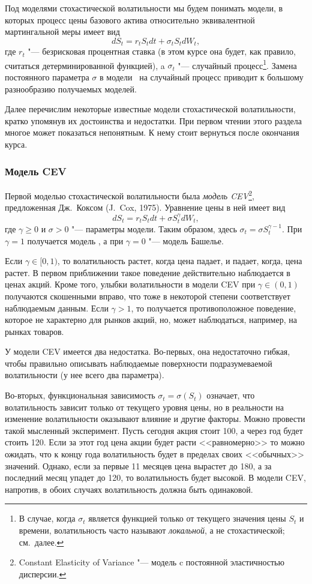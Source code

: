 Под моделями стохастической волатильности мы будем понимать модели, в которых процесс цены базового актива относительно эквивалентной мартингальной меры имеет вид
\[
dS_t = r_tS_t dt + \sigma_t S_t dW_t,
\]
где $r_t$ "--- безрисковая процентная ставка (в этом курсе она будет, как правило, считаться детерминированной функцией), a $\sigma_t$ "--- случайный процесс\footnote{В случае, когда $\sigma_t$ является функцией только от текущего значения цены $S_t$ и времени, волатильность часто называют \emph{локальной}, а не стохастической; см.~далее.}.
Замена постоянного параметра $\sigma$ в модели \bs\ на случайный процесс приводит к большому разнообразию получаемых моделей. 

Далее перечислим некоторые известные модели стохастической волатильности, кратко упомянув их достоинства и недостатки.
При первом чтении этого раздела многое может показаться непонятным.
К нему стоит вернуться после окончания курса.

\subsubsection{Модель CEV}

Первой моделью стохастической волатильности была \emph{модель CEV}\footnote{Constant Elasticity of Variance "--- модель c постоянной эластичностью дисперсии.}, предложенная Дж.~Коксом (J.~Cox, 1975).
Уравнение цены в ней имеет вид
\[
d S_t = r_tS_t dt + \sigma S_t^\gamma d W_t,
\]
где $\gamma \ge 0$ и $\sigma>0$ "--- параметры модели. Таким образом, здесь $\sigma_t = \sigma S_t^{\gamma-1}$. 
При $\gamma=1$ получается модель \bs, а при $\gamma=0$ "--- модель Башелье.

Если $\gamma\in[0,1)$, то волатильность растет, когда цена падает, и падает, когда, цена растет.
В первом приближении такое поведение действительно наблюдается в ценах акций.
Кроме того, улыбки волатильности в модели CEV при $\gamma\in(0,1)$ получаются скошенными вправо, что тоже в некоторой степени соответствует наблюдаемым данным.
Если $\gamma>1$, то получается противоположное поведение, которое не характерно для рынков акций, но, может наблюдаться, например, на рынках товаров.

У модели CEV имеется два недостатка.
Во-первых, она недостаточно гибкая, чтобы правильно описывать наблюдаемые поверхности подразумеваемой волатильности (у нее всего два параметра).

Во-вторых, функциональная зависимость $\sigma_t=\sigma(S_t)$ означает, что волатильность зависит только от текущего уровня цены, но в реальности на изменение волатильности оказывают влияние и другие факторы.
Можно провести такой мысленный эксперимент.
Пусть сегодня акция стоит 100, а через год будет стоить 120.
Если за этот год цена акции будет расти <<равномерно>> то можно ожидать, что к концу года волатильность будет в пределах своих <<обычных>> значений.
Однако, если за первые 11 месяцев цена вырастет до 180, а за последний месяц упадет до 120, то волатильность будет высокой. 
В модели CEV, напротив, в обоих случаях волатильность должна быть одинаковой.


